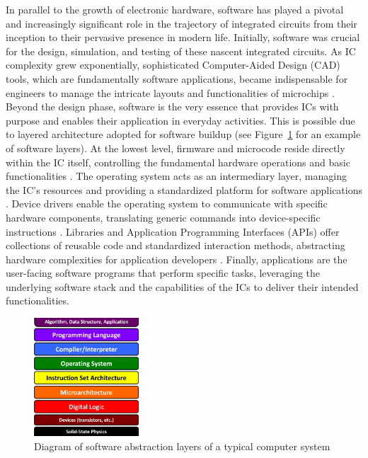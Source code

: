 In parallel to the growth of electronic hardware, software has played a pivotal and increasingly significant role in the trajectory of integrated circuits from their inception to their pervasive presence in modern life.
Initially, software was crucial for the design, simulation, and testing of these nascent integrated circuits.
As IC complexity grew exponentially, sophisticated Computer-Aided Design (CAD) tools, which are fundamentally software applications, became indispensable for engineers to manage the intricate layouts and functionalities of microchips \cite{lienig_fundamentals_2021}.
Beyond the design phase, software is the very essence that provides ICs with purpose and enables their application in everyday activities.
This is possible due to layered architecture adopted for software buildup \cite{tanenbaum_structured_2013} (see Figure~\ref{fig:ch1-abstraction_layers} for an example of software layers).
At the lowest level, firmware and microcode reside directly within the IC itself, controlling the fundamental hardware operations and basic functionalities \cite{hennessy_computer_2017}.
The operating system acts as an intermediary layer, managing the IC's resources and providing a standardized platform for software applications \cite{tanenbaum_modern_2009}.
Device drivers enable the operating system to communicate with specific hardware components, translating generic commands into device-specific instructions \cite{corbet_linux_2005}.
Libraries and Application Programming Interfaces (APIs) offer collections of reusable code and standardized interaction methods, abstracting hardware complexities for application developers \cite{gamma_design_1994}.
Finally, applications are the user-facing software programs that perform specific tasks, leveraging the underlying software stack and the capabilities of the ICs to deliver their intended functionalities.

\begin{figure}
	\begin{center}
		\includegraphics[width=0.35\textwidth]{figures/ch1-abstraction_layers.png}
	\end{center}
	\caption{Diagram of software abstraction layers of a typical computer system \cite{ondich_cs_2022}}\label{fig:ch1-abstraction_layers}
\end{figure}

